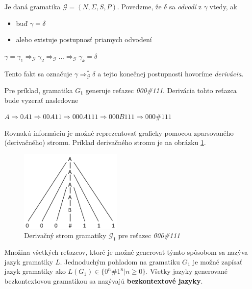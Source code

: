 \begin{definice}
Je daná gramatika $\mathcal{G} = (N, \Sigma , S, P)$. Povedzme, že $\delta$ sa \textit{odvodí} z $\gamma$ vtedy, ak
\begin{itemize}
\item buď $\gamma = \delta$
\item alebo existuje postupnosť priamych odvodení
\end{itemize}
\begin{center}
$\gamma = \gamma_1 \Rightarrow_\mathcal{G} \gamma_2 \Rightarrow_\mathcal{G} ... \Rightarrow_\mathcal{G} \gamma_k = \delta$
\end{center}
Tento fakt sa označuje $\gamma\Rightarrow_\mathcal{G}^*\delta$ a tejto konečnej postupnosti hovoríme \textit{derivácia}. \cite{demlova:gramatiky}
\end{definice}

Pre príklad, gramatika $G_1$ generuje  reťazec \textit{000\#111}. Derivácia tohto reťazca bude vyzerať nasledovne
\begin{center}
$A \Rightarrow 0A1 \Rightarrow 00A11 \Rightarrow 000A111 \Rightarrow 000B111 \Rightarrow 000\#111$
\end{center}

Rovnakú informáciu je možné reprezentovať graficky pomocou zparsovaného (derivačného) stromu. Príklad derivačného stromu je na obrázku \ref{fig:derivacni_strom}. 

\begin{figure}[H]
\begin{center}
\includegraphics[width=5cm]{figures/derivacni_strom.PNG}
\caption{Derivačný strom gramatiky $\mathcal{G}_1$ pre reťazec \textit{000\#111}}
\label{fig:derivacni_strom}
\end{center}
\end{figure}

Množina všetkých reťazcov, ktoré je možné generovať týmto spôsobom sa nazýva jazyk gramatiky $L$. Jednoduchým pohľadom na gramatiku $G_1$ je možné zapísať jazyk gramatiky ako $L(G_1) \in \{0^n\#1^n | n \geq 0\}$. Všetky jazyky generované bezkontextovou gramatikou sa nazývajú \textbf{bezkontextové jazyky}.

